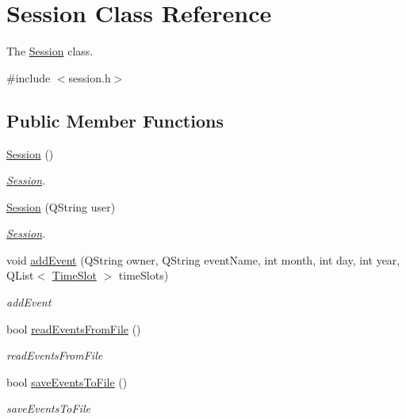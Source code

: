 \hypertarget{class_session}{}\section{Session Class Reference}
\label{class_session}


The \hyperlink{class_session}{Session} class.  




{\ttfamily \#include $<$session.\+h$>$}

\subsection*{Public Member Functions}
\begin{DoxyCompactItemize}
\item 
\hyperlink{class_session_ad92ef09b872c9227e38a6efdd4d8a837}{Session} ()
\begin{DoxyCompactList}\small\item\em \hyperlink{class_session}{Session}. \end{DoxyCompactList}\item 
\hyperlink{class_session_a0a7362dd58b94a67af892eb2cda1082a}{Session} (Q\+String user)
\begin{DoxyCompactList}\small\item\em \hyperlink{class_session}{Session}. \end{DoxyCompactList}\item 
void \hyperlink{class_session_aaeaa643e010cc10517063cd031412ec4}{add\+Event} (Q\+String owner, Q\+String event\+Name, int month, int day, int year, Q\+List$<$ \hyperlink{class_time_slot}{Time\+Slot} $>$ time\+Slots)
\begin{DoxyCompactList}\small\item\em add\+Event \end{DoxyCompactList}\item 
bool \hyperlink{class_session_aff9fd19eb09a0ac22d3e2c2615f9f9e9}{read\+Events\+From\+File} ()
\begin{DoxyCompactList}\small\item\em read\+Events\+From\+File \end{DoxyCompactList}\item 
bool \hyperlink{class_session_af095af8449dd10f6fdf3db6d530e109e}{save\+Events\+To\+File} ()
\begin{DoxyCompactList}\small\item\em save\+Events\+To\+File \end{DoxyCompactList}\item 

\end{DoxyCompactItemize}
